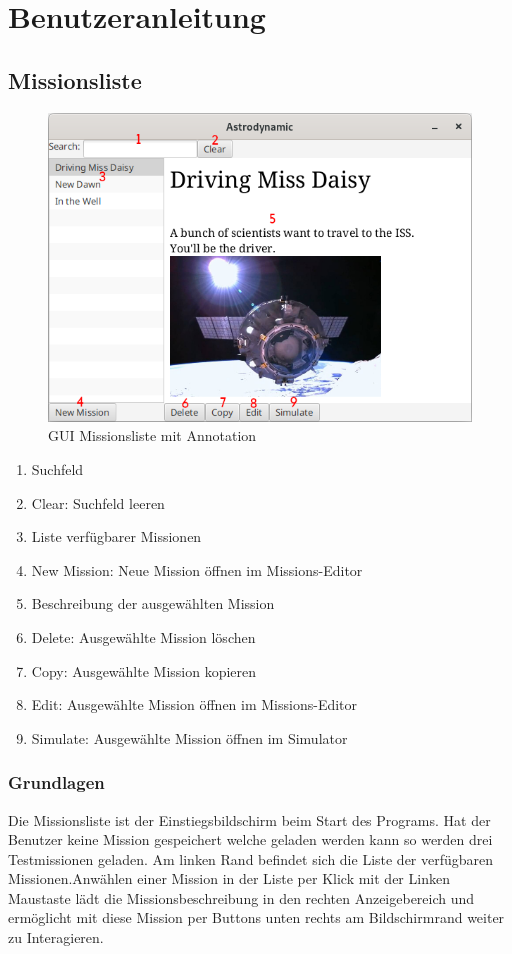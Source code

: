 \chapter{Benutzeranleitung}

\hypertarget{missionlist}{\section{Missionsliste}}

\begin{figure}[H]
	\centering
	\includegraphics[width=12cm]{res/missionsliste.png}
	\caption{GUI Missionsliste mit Annotation}
\end{figure}

\begin{enumerate}[noitemsep]
	\item Suchfeld
	\item Clear: Suchfeld leeren
	\item Liste verfügbarer Missionen
	\item New Mission: Neue Mission öffnen im Missions-Editor
	\item Beschreibung der ausgewählten Mission
	\item Delete: Ausgewählte Mission löschen
	\item Copy: Ausgewählte Mission kopieren
	\item Edit: Ausgewählte Mission öffnen im Missions-Editor
	\item Simulate: Ausgewählte Mission öffnen im Simulator
\end{enumerate}

\subsection{Grundlagen}
Die Missionsliste ist der Einstiegsbildschirm beim Start des Programs.
Hat der Benutzer keine Mission gespeichert welche geladen werden kann so werden drei Testmissionen geladen.
Am linken Rand befindet sich die Liste der verfügbaren Missionen.Anwählen einer Mission in der Liste per Klick mit der Linken Maustaste lädt die Missionsbeschreibung in den rechten Anzeigebereich und ermöglicht mit diese Mission per Buttons unten rechts am Bildschirmrand weiter zu Interagieren.

